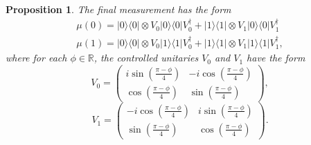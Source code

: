 \documentclass[preprint,12pt, a4paper]{elsarticle}
\newcommand{\ket}[1]{\ensuremath{|#1\rangle}}
\newcommand{\bra}[1]{\ensuremath{\langle#1|}}
\newcommand{\ketbra}[2]{\ensuremath{\ket{#1}\bra{#2}}}
\newcommand{\proj}[1]{\ensuremath{\ketbra{#1}{#1}}}
\newcommand{\1}{{\rm 1\hspace{-0.9mm}l}}
\newtheorem{proposition}{Proposition}
\begin{document}
\begin{proposition}
The  final measurement has the form
\begin{equation}
\begin{split}
\mu(0) = \proj{0} \otimes V_0 \proj{0} V_0^\dagger +  \proj{1} \otimes V_1 
\proj{0} V_1^\dagger  \\ 
\mu(1) = \proj{0} \otimes V_0 \proj{1} V_0^\dagger +  \proj{1} \otimes V_1 
\proj{1} V_1^\dagger,
\end{split}
\end{equation}
where for each $\phi \in \mathbb{R}$,  the controlled unitaries $V_0$ and $V_1$ 
have the form
\begin{equation}
V_0 = \left(\begin{array}{cc}i \sin\left( \frac{\pi - \phi}{4} \right)&-i 
\cos\left( \frac{\pi - \phi}{4} \right)\\ \cos\left( \frac{\pi - 
\phi}{4}\right)& \sin\left( \frac{\pi - \phi}{4} \right)\end{array}\right),
\end{equation}
\begin{equation}
V_1 = \left(\begin{array}{cc}-i \cos\left(\frac{\pi - \phi}{4}\right) &i 
\sin\left( \frac{\pi - \phi}{4}\right)\\\sin\left( \frac{\pi - \phi}{4} \right) 
&  \cos\left( \frac{\pi - \phi}{4} \right) \end{array}\right).
\end{equation}
\end{proposition}

\end{document}
